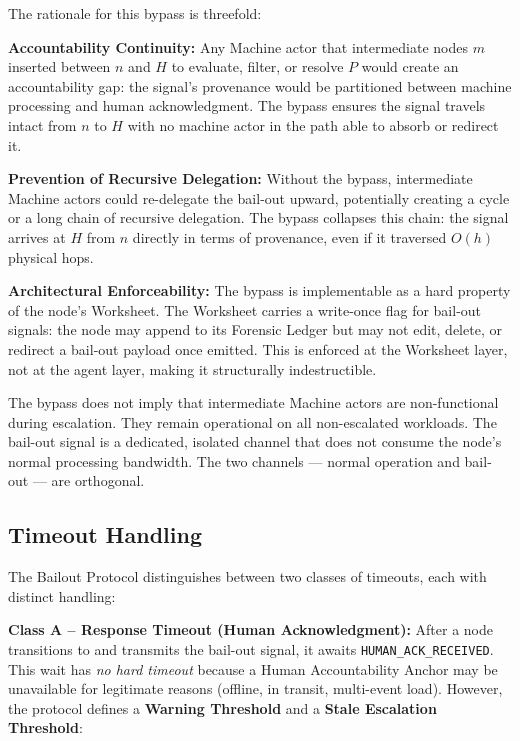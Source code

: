 The rationale for this bypass is threefold:

\medskip
\noindent\textbf{Accountability Continuity:} Any Machine actor that intermediate nodes $m$ inserted between $n$ and $H$ to evaluate, filter, or resolve $P$ would create an accountability gap: the signal's provenance would be partitioned between machine processing and human acknowledgment. The bypass ensures the signal travels intact from $n$ to $H$ with no machine actor in the path able to absorb or redirect it.

\medskip
\noindent\textbf{Prevention of Recursive Delegation:} Without the bypass, intermediate Machine actors could re-delegate the bail-out upward, potentially creating a cycle or a long chain of recursive delegation. The bypass collapses this chain: the signal arrives at $H$ from $n$ directly in terms of provenance, even if it traversed $O(h)$ physical hops.

\medskip
\noindent\textbf{Architectural Enforceability:} The bypass is implementable as a hard property of the node's Worksheet. The Worksheet carries a write-once flag for bail-out signals: the node may append to its Forensic Ledger but may not edit, delete, or redirect a bail-out payload once emitted. This is enforced at the Worksheet layer, not at the agent layer, making it structurally indestructible.

\medskip
\noindent The bypass does not imply that intermediate Machine actors are non-functional during escalation. They remain operational on all non-escalated workloads. The bail-out signal is a dedicated, isolated channel that does not consume the node's normal processing bandwidth. The two channels --- normal operation and bail-out --- are orthogonal.

\subsection{Timeout Handling}

The Bailout Protocol distinguishes between two classes of timeouts, each with distinct handling:

\medskip
\noindent\textbf{Class A -- Response Timeout (Human Acknowledgment):} After a node transitions to  and transmits the bail-out signal, it awaits \texttt{HUMAN\_ACK\_RECEIVED}. This wait has \emph{no hard timeout} because a Human Accountability Anchor may be unavailable for legitimate reasons (offline, in transit, multi-event load). However, the protocol defines a \textbf{Warning Threshold} and a \textbf{Stale Escalation Threshold}:

